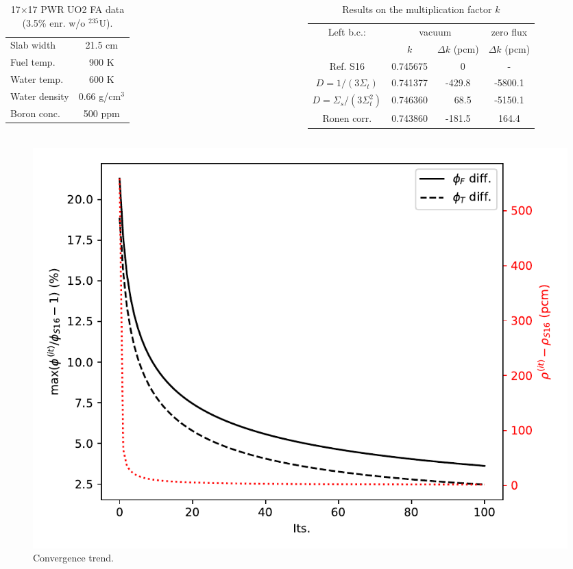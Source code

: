 \documentclass[black]{slideCEA}
\begin{document}
\begin{frame}[allowframebreaks]
  \begin{columns}
  \begin{table}\centering
  \caption{17$\times$17 PWR UO2 FA data (3.5\% enr. w/o $^{235}$U).}
  \begin{tabular}{lc} \hline \hline
    Slab width & 21.5 cm\\
    Fuel temp. & 900 K\\
    Water temp.& 600 K\\
    Water density& 0.66 g/cm$^3$\\
    Boron conc.& 500 ppm\\ \hline \hline
  \end{tabular}
  \end{table}
  \begin{table}
  \centering
  \caption{Results on the multiplication factor $k$}
  \begin{tabular}{*{4}{c}} \hline \hline
   Left b.c.: & \multicolumn{2}{c}{vacuum} & zero flux\\
   \cline{2-4}
    & $k$ & $\Delta k$ (pcm) & $\Delta k$ (pcm) \\ \hline
    Ref. S16             & 0.745675 & ~~~0~ &    -    \\
    $D = 1/(3 \Sigma_t)$ & 0.741377 & -429.8& -5800.1 \\
    $D = \Sigma_s/(3 \Sigma_t^2)$ & 0.746360 & ~~68.5& -5150.1 \\
    Ronen corr. & 0.743860 & \textcolor{ceablue1}{-181.5} & \textcolor{ceablue1}{164.4}\\
    \hline \hline
  \end{tabular}
  \end{table}
  \end{columns}

  \begin{figure}
    \centering
    \includegraphics[width=.75\textwidth]{../figures/kflxconv.pdf}
    \caption{Convergence trend.}
  \end{figure}


\end{frame}
\end{document}

